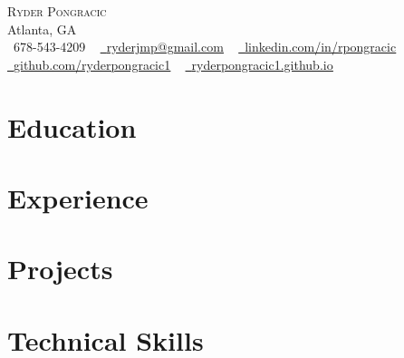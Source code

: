 \documentclass[letterpaper,11pt]{article}
\begin{document}
\begin{center}
    {\Huge \scshape Ryder Pongracic} \\ \vspace{1pt}
    Atlanta, GA \\ \vspace{1pt}
    \small \raisebox{-0.1\height}\faPhone\ 678-543-4209 ~
    \href{mailto:ryderjmp@gmail.com}{\raisebox{-0.2\height}\faEnvelope\ \underline{ryderjmp@gmail.com}} ~
    \href{https://linkedin.com/in/rpongracic}{\raisebox{-0.2\height}\faLinkedin\ \underline{linkedin.com/in/rpongracic}} \\ \vspace{3pt}
    \href{https://github.com/ryderpongracic1}{\raisebox{-0.2\height}\faGithub\ \underline{github.com/ryderpongracic1}} ~
    \href{https://ryderpongracic1.github.io/}{\raisebox{-0.2\height}\faGlobe\ \underline{ryderpongracic1.github.io}}
    \vspace{-8pt}
\end{center}

\section{Education}
  

\section{Experience}
  
  \vspace{-16pt}

\section{Projects}
    \vspace{-5pt}
    \resumeSubHeadingListStart
      
      
      
    \resumeSubHeadingListEnd
    \vspace{-15pt}

\section{Technical Skills}
  
  \vspace{-16pt}
\end{document}
